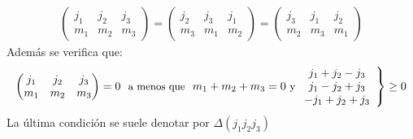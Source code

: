 \begin{eqnarray} \begin{pmatrix}
		j_1 & j_2 & j_3 \\ m_1 & m_2 & m_3
	\end{pmatrix} = \begin{pmatrix}
	j_2 & j_3 & j_1 \\ m_3 & m_1 & m_2
	\end{pmatrix} = \begin{pmatrix}
	j_3 & j_1 & j_2 \\ m_2 & m_3 & m_1
	\end{pmatrix}
\end{eqnarray}
Además se verifica que:
\begin{eqnarray} \begin{pmatrix}
		j_1 & j_2 & j_3 \\ m_1 & m_2 & m_3 
		\end{pmatrix}
		 = 0  \ \ \text{{\small a menos que}} \ \ m_1 + m_2 + m_3 = 0 \ \text{{\small y}}  \left. \begin{array}{c}
			j_1 + j_2 - j_3 \\
			j_1 - j_2 + j_3 \\
			-j_1 + j_2 + j_3 
		\end{array} \right\rbrace \geq 0
\end{eqnarray}
La última condición se suele denotar por $\Delta (j_1j_2j_3)$



